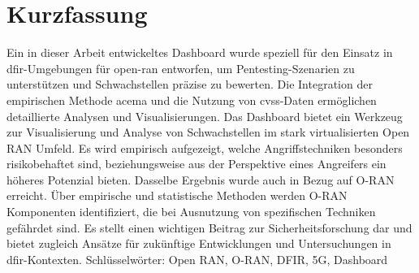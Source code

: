 \chapter*{Kurzfassung}
\label{chap:kurzfassung}
Ein in dieser Arbeit entwickeltes Dashboard wurde speziell für den Einsatz in \gls{dfir}-Umgebungen für \gls{open-ran} entworfen, um Pentesting-Szenarien zu unterstützen und Schwachstellen präzise zu bewerten. Die Integration der empirischen Methode \gls{acema} und die Nutzung von \gls{cvss}-Daten ermöglichen detaillierte Analysen und Visualisierungen. Das Dashboard bietet ein Werkzeug zur Visualisierung und Analyse von Schwachstellen im stark virtualisierten Open RAN Umfeld. Es wird empirisch aufgezeigt, welche Angriffstechniken besonders risikobehaftet sind, beziehungsweise aus der Perspektive eines Angreifers ein höheres Potenzial bieten. Dasselbe Ergebnis wurde auch in Bezug auf O-RAN erreicht. Über empirische und statistische Methoden werden O-RAN Komponenten identifiziert, die bei Ausnutzung von spezifischen Techniken gefährdet sind. Es stellt einen wichtigen Beitrag zur Sicherheitsforschung dar und bietet zugleich Ansätze für zukünftige Entwicklungen und Untersuchungen in \gls{dfir}-Kontexten.
Schlüsselwörter: Open RAN, O-RAN, DFIR, 5G, Dashboard

